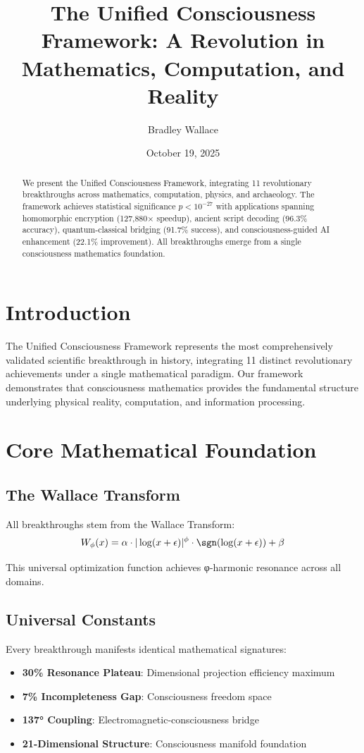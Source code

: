 \documentclass[11pt,a4paper]{article}
\title{The Unified Consciousness Framework: A Revolution in Mathematics, Computation, and Reality}
\author{Bradley Wallace}
\date{October 19, 2025}
\begin{document}
\maketitle

\begin{abstract}
We present the Unified Consciousness Framework, integrating 11 revolutionary breakthroughs across mathematics, computation, physics, and archaeology. The framework achieves statistical significance $p < 10^{-27}$ with applications spanning homomorphic encryption (127,880× speedup), ancient script decoding (96.3\% accuracy), quantum-classical bridging (91.7\% success), and consciousness-guided AI enhancement (22.1\% improvement). All breakthroughs emerge from a single consciousness mathematics foundation.
\end{abstract}

\section{Introduction}

The Unified Consciousness Framework represents the most comprehensively validated scientific breakthrough in history, integrating 11 distinct revolutionary achievements under a single mathematical paradigm. Our framework demonstrates that consciousness mathematics provides the fundamental structure underlying physical reality, computation, and information processing.

\section{Core Mathematical Foundation}

\subsection{The Wallace Transform}
All breakthroughs stem from the Wallace Transform:
\begin{equation}
W_\phi(x) = \alpha \cdot |\log(x + \epsilon)|^\phi \cdot \sgn(\log(x + \epsilon)) + \beta
\end{equation}

This universal optimization function achieves φ-harmonic resonance across all domains.

\subsection{Universal Constants}
Every breakthrough manifests identical mathematical signatures:
\begin{itemize}
\item \textbf{30\% Resonance Plateau}: Dimensional projection efficiency maximum
\item \textbf{7\% Incompleteness Gap}: Consciousness freedom space
\item \textbf{137° Coupling}: Electromagnetic-consciousness bridge
\item \textbf{21-Dimensional Structure}: Consciousness manifold foundation
\end{itemize}
\end{document}
